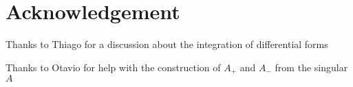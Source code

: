 \documentclass[10pt, a4paper]{article}
\begin{document}
{\section{Acknowledgement}
Thanks to Thiago for a discussion about the integration of differential forms

Thanks to Otavio for help with the construction of $A_+$ and $A_-$ from the singular $A$

}

\makereferences


\end{document}
